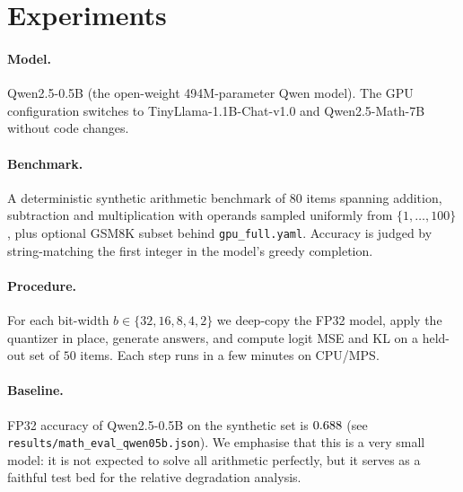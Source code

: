 \section{Experiments}

\paragraph{Model.}
Qwen2.5-0.5B (the open-weight 494M-parameter Qwen model). The GPU
configuration switches to TinyLlama-1.1B-Chat-v1.0 and Qwen2.5-Math-7B
without code changes.

\paragraph{Benchmark.}
A deterministic synthetic arithmetic benchmark of 80 items spanning
addition, subtraction and multiplication with operands sampled uniformly
from $\{1,\dots,100\}$, plus optional GSM8K subset behind
\texttt{gpu\_full.yaml}. Accuracy is judged by string-matching the first
integer in the model's greedy completion.

\paragraph{Procedure.}
For each bit-width $b \in \{32, 16, 8, 4, 2\}$ we deep-copy the FP32
model, apply the quantizer in place, generate answers, and compute logit
MSE and KL on a held-out set of $50$ items. Each step runs in a few
minutes on CPU/MPS.

\paragraph{Baseline.}
FP32 accuracy of Qwen2.5-0.5B on the synthetic set is
$0.688$ (see \texttt{results/math\_eval\_qwen05b.json}).
We emphasise that this is a very small model: it is not expected to solve
all arithmetic perfectly, but it serves as a faithful test bed for the
relative degradation analysis.
